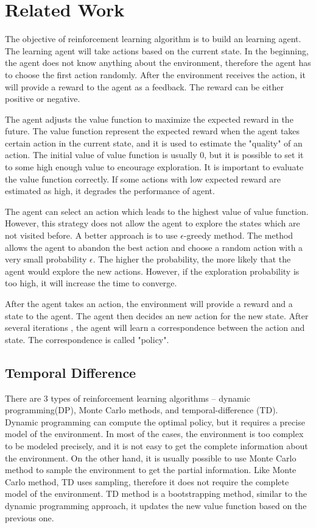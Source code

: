 
\chapter{Related Work}
\label{ch:Related}

The objective of reinforcement learning algorithm is to build an learning agent. The learning agent will take
actions based on the current state. In the beginning, the agent does not know anything about 
the environment, therefore the agent has to choose the first action randomly. After the environment
receives the action, it will provide a reward to the agent as a feedback. The reward can be either
positive or negative.

The agent adjusts the value function to maximize the expected reward in the future.
The value function represent the expected reward when the agent takes certain action in the current
state, and it is used to estimate the "quality" of an action. The initial value of value function is 
usually 0, but it is possible to set it to some high enough value to encourage exploration.
It is important to evaluate the value function 
correctly. If some actions with low expected reward are estimated as high, it degrades the
performance of agent.

The agent can select an action which leads to the highest value of value function. However, 
this strategy does not allow the agent to explore the states which are not visited before.
A better approach is to use $\epsilon$-greedy method. The method allows the agent to abandon the
best action and choose
a random action with a very small probability $\epsilon$. The higher the probability, the more
likely that the agent would explore the new actions. However, if the exploration probability 
is too high, it will increase the time to converge.

After the agent takes an action, the environment will provide a reward and a state to the
agent. The agent then decides an new action for the new state. After several iterations
, the agent will learn a correspondence between the action and state. The correspondence is called 
"policy". 

\section{Temporal Difference}
\label{sec:TD}
There are 3 types of reinforcement learning algorithms -- dynamic programming(DP), Monte Carlo 
methods, and temporal-difference (TD). Dynamic programming can compute the optimal policy, but it 
requires a precise model of the environment. In most of the cases, the environment
is too complex to be modeled precisely, and it is not easy to get the complete information about
the environment. On the other hand, it is usually possible to use Monte Carlo method to sample the environment to
get the partial information. 
Like Monte Carlo method, TD uses sampling, therefore it does not require the 
complete model of the environment. TD method is a bootstrapping method, similar to the dynamic 
programming approach, it updates the new value function based on the previous one.

